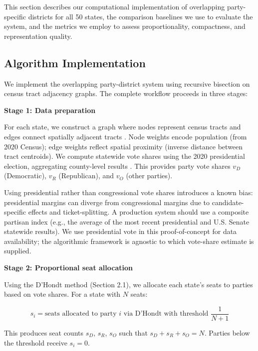 
This section describes our computational implementation of overlapping party-specific districts for all 50 states, the comparison baselines we use to evaluate the system, and the metrics we employ to assess proportionality, compactness, and representation quality.

\subsection{Algorithm Implementation}

We implement the overlapping party-district system using recursive bisection on census tract adjacency graphs. The complete workflow proceeds in three stages:

\textbf{Stage 1: Data preparation}

For each state, we construct a graph where nodes represent census tracts and edges connect spatially adjacent tracts \citep{author2024recursive}. Node weights encode population (from 2020 Census); edge weights reflect spatial proximity (inverse distance between tract centroids). We compute statewide vote shares using the 2020 presidential election, aggregating county-level results \citep{leip2020}. This provides party vote shares $v_D$ (Democratic), $v_R$ (Republican), and $v_O$ (other parties).
\begin{remark}
Using presidential rather than congressional vote shares introduces a known bias: presidential margins can diverge from congressional margins due to candidate-specific effects and ticket-splitting. A production system should use a composite partisan index (e.g., the average of the most recent presidential and U.S. Senate statewide results). We use presidential vote in this proof-of-concept for data availability; the algorithmic framework is agnostic to which vote-share estimate is supplied.
\end{remark}

\textbf{Stage 2: Proportional seat allocation}

Using the D'Hondt method (Section 2.1), we allocate each state's seats to parties based on vote shares. For a state with $N$ seats:

\begin{equation}
s_i = \text{seats allocated to party } i \text{ via D'Hondt with threshold } \frac{1}{N+1}
\end{equation}

This produces seat counts $s_D$, $s_R$, $s_O$ such that $s_D + s_R + s_O = N$. Parties below the threshold receive $s_i = 0$.

